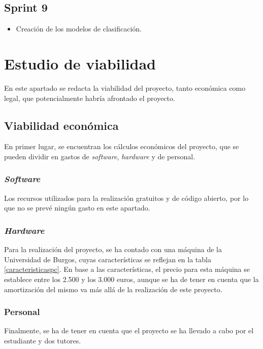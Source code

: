 \subsection{Sprint 9}

\begin{itemize}
\item Creación de los modelos de clasificación.
\end{itemize}

\section{Estudio de viabilidad}

En este apartado se redacta la viabilidad del proyecto, tanto económica como legal, que potencialmente habría afrontado el proyecto.

\subsection{Viabilidad económica}

En primer lugar, se encuentran los cálculos económicos del proyecto, que se pueden dividir en gastos de \textit{software}, \textit{hardware} y de personal.

\subsubsection{\textit{Software}}

Los recursos utilizados para la realización gratuitos y de código abierto, por lo que no se prevé ningún gasto en este apartado.

\subsubsection{\textit{Hardware}}

Para la realización del proyecto, se ha contado con una máquina de la Universidad de Burgos, cuyas características se reflejan en la tabla \ref{caracteristicaspc}.
En base a las características, el precio para esta máquina se establece entre los 2.500 y los 3.000 euros, aunque se ha de tener en cuenta que la amortización del mismo va más allá de la realización de este proyecto.

\subsubsection{Personal}

Finalmente, se ha de tener en cuenta que el proyecto se ha llevado a cabo por el estudiante y dos tutores.

